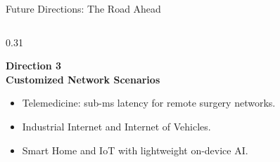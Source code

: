 {\begin{frame}{Future Directions: The Road Ahead}
\begin{columns}[T, totalwidth=\textwidth]
    \begin{column}{0.31\textwidth}
      \begin{tcolorbox}[problemcard=solutiongreen]
        {\color{solutiongreen}\bfseries\small
          Direction 3}\\[2pt]
        {\color{solutiongreen}\bfseries\scriptsize
          Customized Network Scenarios}
        \vspace{4pt}
        \begin{itemize}
          \setlength\itemsep{3pt}
          \fontsize{7}{8}\selectfont\color{HUAdark}
          \item Telemedicine: sub-ms latency
                for remote surgery networks.
          \item Industrial Internet and
                Internet of Vehicles.
          \item Smart Home and IoT with
                lightweight on-device AI. \newline \newline
        \end{itemize}
      \end{tcolorbox}
    \end{column}

  \end{columns}

\end{frame}
}